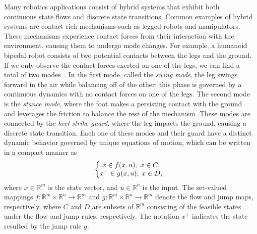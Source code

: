 

Many robotics applications consist of hybrid systems that exhibit both
continuous state flows and discrete state transitions. Common examples of hybrid
systems are contact-rich mechanisms such as legged robots and manipulators.
These mechanisms experience contact forces from their interaction with the
environment, causing them to undergo mode changes. 
%
For example, a humanoid bipedal robot consists of two potential contacts between
the legs and the ground.
%
If we only observe the contact forces exerted on one of the legs, we can find a
total of two modes~\cite{underactuated}.
%
In the first mode, called the \textit{swing mode}, the leg swings forward in the
air while balancing off of the other; this phase is governed by a continuous
dynamics with no contact forces on one of the legs. 
%
The second mode is the \textit{stance mode}, where the foot makes a persisting
contact with the ground and leverages the friction to balance the rest of the
mechanism.
%
These modes are connected by the \textit{heel strike guard}, where the leg
impacts the ground, causing a discrete state transition. 
%
Each one of these modes and their guard have a distinct dynamic behavior
governed by unique equations of motion, which can be written in a compact manner
as~\cite{goebel2009hybrid}
\begin{equation}
    \left\{
    \begin{array}{@{}c@{}}
        \smash[t]{\dot{x} \in f(x, u), \; x \in C,} \\
        \smash[b]{x^+ \in g(x, u), \; x \in D,}
    \end{array}\right.
    \label{eq:cont_and_guards}
\end{equation}
\noindent where $x \in \mathbb{R}^m$ is the state vector, and $u \in
\mathbb{R}^n$ is the input.
%
The set-valued mappings $f: \mathbb{R}^m \times \mathbb{R}^n \rightarrow
\mathbb{R}^m$ and $g: \mathbb{R}^m \times \mathbb{R}^n \rightarrow \mathbb{R}^m$
denote the flow and jump maps, respectively, where $C$ and $D$ are subsets of
$\mathbb{R}^m$ consisting of the feasible states under the flow and jump
rules, respectively. 
%
The notation $x^+$ indicates the state resulted by the jump rule $g$.


